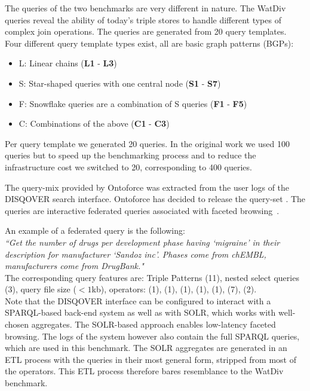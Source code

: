 The queries of the two benchmarks are very different in nature. 
The WatDiv queries reveal the ability of today's triple stores to handle different types of complex join operations.
The queries are generated from 20 query templates. Four different query template types exist, all are basic graph patterns (BGPs): 
\begin{itemize}
	\item L: Linear chains (\textbf{L1} - \textbf{L3})
	\item S: Star-shaped queries with one central node (\textbf{S1} - \textbf{S7})
	\item F: Snowflake queries are a combination of S queries (\textbf{F1} - \textbf{F5})
	\item C: Combinations of the above (\textbf{C1} - \textbf{C3})
\end{itemize}
Per query template we generated 20 queries. In the original work we used 100 queries but to speed up the benchmarking process and to reduce the infrastructure cost we switched to 20, corresponding to 400 queries.

The query-mix provided by Ontoforce was extracted from the user logs of the DISQOVER search interface. Ontoforce has decided to release the query-set .
The queries are interactive federated queries associated with faceted browsing~\cite{Ferre, Oren}.

An example of a federated query is the following: \\

\textit{``Get the number of drugs per development phase having `migraine'
in their description for manufacturer `Sandoz inc'. Phases come
from chEMBL, manufacturers come from DrugBank."} \\

The corresponding query features are: Triple Patterns (11), nested select queries (3), query file size ($<1$kb), operators:  (1), (1), (1), (1), (1), (7), (2).  \\

Note that the DISQOVER interface can be configured to interact with a SPARQL-based back-end system as well as with SOLR, which works with well-chosen aggregates. The SOLR-based approach enables low-latency faceted browsing. The logs of the system however also contain the full SPARQL queries, which are used in this benchmark. 
The SOLR aggregates are generated in an ETL process with the queries in their most general form, stripped from most of the operators. This ETL process therefore bares resemblance to the WatDiv benchmark.

